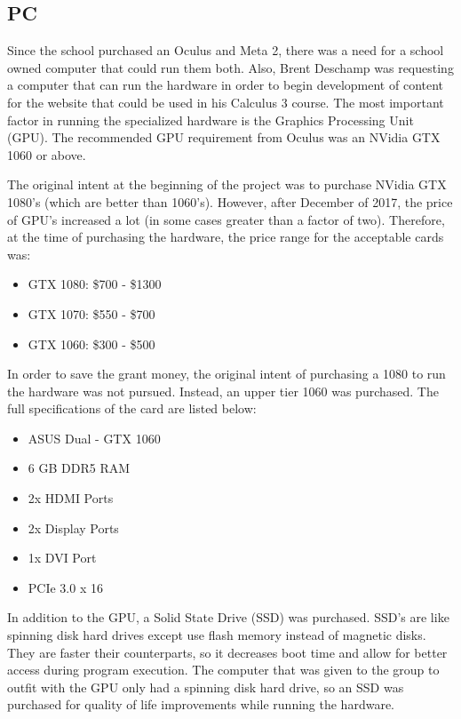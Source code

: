 
\subsection{PC}

    Since the school purchased an Oculus and Meta 2, there was a need for a school owned computer that could run them both.  Also, Brent Deschamp was requesting a computer that can run the hardware in order to begin development of content for the website that could be used in his Calculus 3 course.  The most important factor in running the specialized hardware is the Graphics Processing Unit (GPU).  The recommended GPU requirement from Oculus was an NVidia GTX 1060 or above.  

    The original intent at the beginning of the project was to purchase NVidia GTX 1080's (which are better than 1060's).  However, after December of 2017, the price of GPU's increased a lot (in some cases greater than a factor of two).  Therefore, at the time of purchasing the hardware, the price range for the acceptable cards was:

    \begin{itemize}
        \item GTX 1080: \$700 - \$1300
        \item GTX 1070: \$550 - \$700
        \item GTX 1060: \$300 - \$500 
    \end{itemize}

    In order to save the grant money, the original intent of purchasing a 1080 to run the hardware was not pursued.  Instead, an upper tier 1060 was purchased.  The full specifications of the card are listed below:

    \begin{itemize}
        \item ASUS Dual - GTX 1060
        \item 6 GB DDR5 RAM
        \item 2x HDMI Ports
        \item 2x Display Ports
        \item 1x DVI Port
        \item PCIe 3.0 x 16
    \end{itemize}

    In addition to the GPU, a Solid State Drive (SSD) was purchased.  SSD's are like spinning disk hard drives except use flash memory instead of magnetic disks.  They are faster their counterparts, so it decreases boot time and allow for better access during program execution.  The computer that was given to the group to outfit with the GPU only had a spinning disk hard drive, so an SSD was purchased for quality of life improvements while running the hardware.

